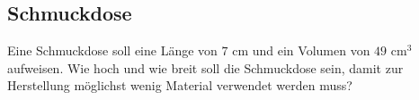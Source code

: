 

\subsection{Schmuckdose}

Eine Schmuckdose soll eine Länge von $7 \text{ cm}$ und ein Volumen
von $49 \text{ cm}^3$ aufweisen. Wie hoch und wie breit soll die
Schmuckdose sein, damit zur Herstellung möglichst wenig Material
verwendet werden muss?





\subsection{}

\TNTeop{}%





